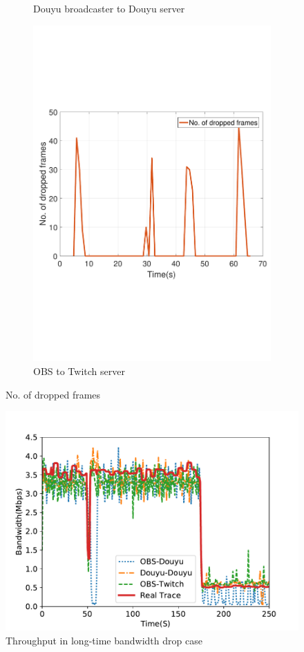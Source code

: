 \begin{figure}[htb]
\begin{subfigure}[b]{0.32\textwidth}
  \vspace{-0.05in}    
  \caption{Douyu broadcaster to Douyu server}
  \label{fig:douyu-drop}
\end{subfigure}
\begin{subfigure}[b]{0.32\textwidth}%
  \includegraphics[width=0.8\linewidth]{fig/obs_twitch_drop.pdf}
  \vspace{-0.05in}    
  \caption{OBS to Twitch server}
  \label{fig:obs-twitch-drop}
\end{subfigure}
\caption{No. of dropped frames}
\vspace{-0.2in}
\label{fig:commerical-drop}
\end{figure}

\begin{figure}[htb]
\centering
\includegraphics[width=.7\columnwidth]{fig/vary-bandwidth.pdf}
\vspace{-0.05in}
\caption{Throughput in long-time bandwidth drop case}
\vspace{-0.15in}
\label{fig:vary-bandwidth}
\end{figure}

